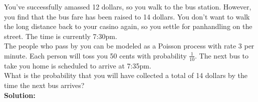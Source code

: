 \documentclass[12pt]{article}
\begin{document}




You've successfully amassed 12 dollars, so you walk to the bus station. However, you find that the bus fare has been raised to 14 dollars. You don't want to walk the long distance back to your casino again, so you settle for panhandling on the street. The time is currently 7:30pm. \\

The people who pass by you can be modeled as a Poisson process with rate 3 per minute. Each person will toss you 50 cents with probability $\frac{1}{10}$. The next bus to take you home is scheduled to arrive at 7:35pm.\\

{\color{blue} What is the probability that you will have collected a total of 14 dollars by the time the next bus arrives?}\\

\textbf{Solution:} 
\end{document}
